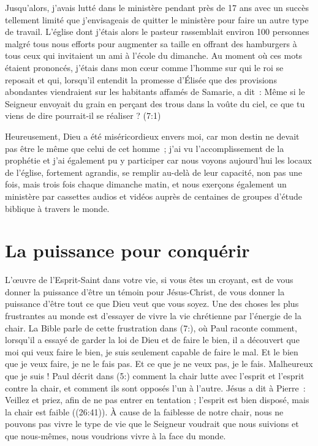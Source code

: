 Jusqu'alors, j'avais lutté dans le ministère pendant près de 17 ans
 avec un succès tellement limité que j'envisageais de quitter le ministère
 pour faire un autre type de travail.
 L'église dont j'étais alors le pasteur rassemblait environ 100 personnes
 malgré tous nous efforts pour augmenter sa taille en offrant des hamburgers
 à tous ceux qui invitaient un ami à l'école du dimanche.
 Au moment où ces mots étaient prononcés, j'étais dans mon cœur comme l'homme
 sur qui le roi se reposait et qui, lorsqu'il entendit la promesse d'Élisée
 que des provisions abondantes viendraient sur les habitants affamés
 de Samarie, a dit~:
 \og Même si le Seigneur envoyait du grain en perçant des trous dans
 la voûte du ciel, ce que tu viens de dire pourrait-il se réaliser ? \fg{}
 (7:1)

Heureusement, Dieu a été miséricordieux envers moi,
 car mon destin ne devait pas être le même que celui de cet homme~;
 j'ai vu l'ac\-com\-plis\-sement de la prophétie et j'ai également pu y participer
 car nous voyons aujourd'hui les locaux de l'église, fortement agrandis,
 se remplir au-delà de leur capacité, non pas une fois, mais trois fois
 chaque dimanche matin, et nous exerçons également un ministère
 par cassettes audios et vidéos auprès de centaines de groupes
 d'étude biblique à travers le monde.

\section{La puissance pour conqu\'erir}

L'œuvre de l'Esprit-Saint dans votre vie, si vous êtes un croyant,
 est de vous donner la puissance d'être un témoin pour Jésus-Christ,
 de vous donner la puissance d'être tout ce que Dieu veut que vous soyez.
 Une des choses les plus frustrantes au monde est d'essayer
 de vivre la vie chrétienne par l'énergie de la chair.
 La Bible parle de cette frustration dans (7:),
 où Paul raconte comment, lors\-qu'il a essayé de garder la loi de Dieu
 et de faire le bien, il a découvert que \og moi qui veux faire le bien,
 je suis seulement capable de faire le mal. Et le bien que je veux faire,
 je ne le fais pas. Et ce que je ne veux pas, je le fais.
 Malheureux que je suis ! \fg{}
 Paul décrit dans (5:) comment la chair lutte avec l'esprit
 et l'esprit contre la chair, et comment ils sont opposés l'un à l'autre.
 Jésus a dit à Pierre~:
 \og Veillez et priez, afin de ne pas entrer en tentation ;
 l'esprit est bien disposé, mais la chair est faible \fg{}
 ((26:41)).
 À cause de la faiblesse de notre chair, nous ne pouvons pas vivre
 le type de vie que le Seigneur voudrait que nous suivions
 et que nous-mêmes, nous voudrions vivre à la face du monde.

